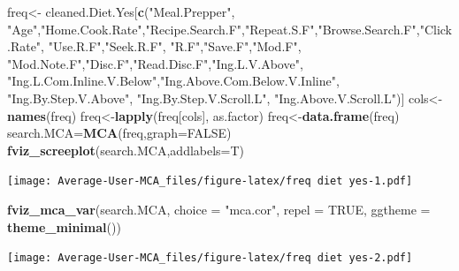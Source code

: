 \documentclass[
]{article}
\newenvironment{Shaded}{\begin{snugshade}}{\end{snugshade}}
\newcommand{\DataTypeTok}[1]{\textcolor[rgb]{0.13,0.29,0.53}{#1}}
\newcommand{\KeywordTok}[1]{\textcolor[rgb]{0.13,0.29,0.53}{\textbf{#1}}}
\newcommand{\NormalTok}[1]{#1}
\newcommand{\OtherTok}[1]{\textcolor[rgb]{0.56,0.35,0.01}{#1}}
\newcommand{\StringTok}[1]{\textcolor[rgb]{0.31,0.60,0.02}{#1}}
\begin{document}
\begin{Shaded}
\begin{Highlighting}[]
\NormalTok{freq<-}\StringTok{ }\NormalTok{cleaned.Diet.Yes[}\KeywordTok{c}\NormalTok{(}\StringTok{"Meal.Prepper"}\NormalTok{, }\StringTok{"Age"}\NormalTok{,}\StringTok{"Home.Cook.Rate"}\NormalTok{,}\StringTok{"Recipe.Search.F"}\NormalTok{,}\StringTok{"Repeat.S.F"}\NormalTok{,}\StringTok{"Browse.Search.F"}\NormalTok{,}\StringTok{"Click.Rate"}\NormalTok{,}
            \StringTok{"Use.R.F"}\NormalTok{,}\StringTok{"Seek.R.F"}\NormalTok{, }\StringTok{"R.F"}\NormalTok{,}\StringTok{"Save.F"}\NormalTok{,}\StringTok{"Mod.F"}\NormalTok{, }\StringTok{"Mod.Note.F"}\NormalTok{,}\StringTok{"Disc.F"}\NormalTok{,}\StringTok{"Read.Disc.F"}\NormalTok{,}\StringTok{"Ing.L.V.Above"}\NormalTok{,}
            \StringTok{"Ing.L.Com.Inline.V.Below"}\NormalTok{,}\StringTok{"Ing.Above.Com.Below.V.Inline"}\NormalTok{,  }\StringTok{"Ing.By.Step.V.Above"}\NormalTok{,  }\StringTok{"Ing.By.Step.V.Scroll.L"}\NormalTok{,}
            \StringTok{"Ing.Above.V.Scroll.L"}\NormalTok{)]}
\NormalTok{cols<-}\KeywordTok{names}\NormalTok{(freq)}
\NormalTok{freq<-}\KeywordTok{lapply}\NormalTok{(freq[cols], as.factor)}
\NormalTok{freq<-}\KeywordTok{data.frame}\NormalTok{(freq)}
\NormalTok{search.MCA=}\KeywordTok{MCA}\NormalTok{(freq,}\DataTypeTok{graph=}\OtherTok{FALSE}\NormalTok{)}
\KeywordTok{fviz_screeplot}\NormalTok{(search.MCA,}\DataTypeTok{addlabels=}\NormalTok{T)}
\end{Highlighting}
\end{Shaded}

\texttt{[image: Average-User-MCA\_files/figure-latex/freq diet yes-1.pdf]}

\begin{Shaded}
\begin{Highlighting}[]
\KeywordTok{fviz_mca_var}\NormalTok{(search.MCA, }\DataTypeTok{choice =} \StringTok{"mca.cor"}\NormalTok{, }\DataTypeTok{repel =} \OtherTok{TRUE}\NormalTok{,}
             \DataTypeTok{ggtheme =} \KeywordTok{theme_minimal}\NormalTok{())}
\end{Highlighting}
\end{Shaded}

\texttt{[image: Average-User-MCA\_files/figure-latex/freq diet yes-2.pdf]}

\begin{Shaded}
\end{Shaded}
\end{document}

